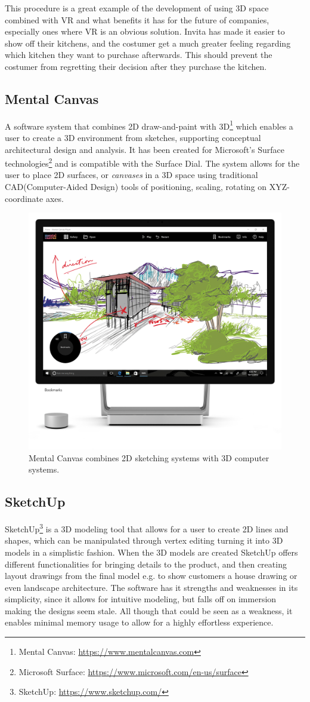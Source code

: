 			This procedure is a great example of the development of using 3D space combined with VR and what benefits it has for the future of companies, especially ones where VR is an obvious solution. Invita has made it easier to show off their kitchens, and the costumer get a much greater feeling regarding which kitchen they want to purchase afterwards. This should prevent the costumer from regretting their decision after they purchase the kitchen.

			
		\subsection{Mental Canvas}
			A software system that combines 2D draw-and-paint with 3D\footnote{Mental Canvas: \url{https://www.mentalcanvas.com}} which enables a user to create a 3D environment from sketches, supporting conceptual architectural design and analysis. It has been created for Microsoft's Surface technologies\footnote{Microsoft Surface: \url{https://www.microsoft.com/en-us/surface}} and is compatible with the Surface Dial. The system allows for the user to place 2D surfaces, or \textit{canvases} in a 3D space using traditional CAD(Computer-Aided Design) tools of positioning, scaling, rotating on XYZ-coordinate axes.\cite{sotaMentalCanvas}
			
			\begin{figure}[H]
				\centering
				\includegraphics[width=0.5\linewidth]{figure/Analysis/mentalCanvas.png}
				\caption{Mental Canvas combines 2D sketching systems with 3D computer systems.}
				\label{fig:mentalCanvas}
			\end{figure}

		\subsection{SketchUp}
			SketchUp\footnote{SketchUp: \url{https://www.sketchup.com/}} is a 3D modeling tool that allows for a user to create 2D lines and shapes, which can be manipulated through vertex editing turning it into 3D models in a simplistic fashion. When the 3D models are created SketchUp offers different functionalities for bringing details to the product, and then creating layout drawings from the final	model e.g. to show customers a house drawing or even landscape architecture. The software has it strengths and weaknesses in its simplicity, since it allows for intuitive modeling, but falls off on immersion making the designs seem stale. All though that could be seen as a weakness, it enables minimal memory usage to allow for a highly effortless experience. \\
			
